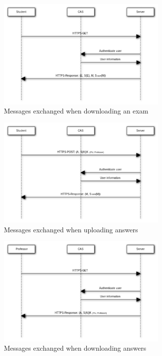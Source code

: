 \documentclass{article}
\begin{document}
\begin{figure}
\begin{center}
\includegraphics[width=0.75\textwidth]{images/download_exam.pdf}
\caption{Messages exchanged when downloading an exam}
\label{fig:download-exam}
\end{center}
\end{figure}

\begin{figure}
\begin{center}
\includegraphics[width=0.75\textwidth]{images/upload_answers.pdf}
\caption{Messages exchanged when uploading answers}
\label{fig:upload-answers}
\end{center}
\end{figure}

\begin{figure}
\begin{center}
\includegraphics[width=0.75\textwidth]{images/download_answers.pdf}
\caption{Messages exchanged when downloading answers}
\label{fig:download-answers}
\end{center}
\end{figure}
\end{document}
